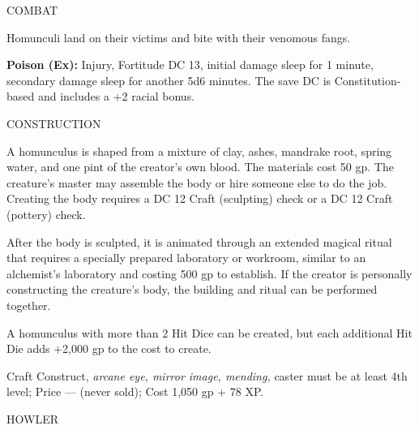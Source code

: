 \documentclass{article}
\begin{document}
COMBAT

Homunculi land on their victims and bite with their venomous fangs.

\textbf{Poison (Ex):} Injury, Fortitude DC 13, initial damage sleep for 1 minute, 
secondary damage sleep for another 5d6 minutes. The save DC is Constitution-based 
and includes a +2 racial bonus.

CONSTRUCTION

A homunculus is shaped from a mixture of clay, ashes, mandrake root, spring water, 
and one pint of the creator's own blood. The materials cost 50 gp. The creature's 
master may assemble the body or hire someone else to do the job. Creating the body 
requires a DC 12 Craft (sculpting) check or a DC 12 Craft (pottery) check.

After the body is sculpted, it is animated through an extended magical ritual that 
requires a specially prepared laboratory or workroom, similar to an alchemist's 
laboratory and costing 500 gp to establish. If the creator is personally constructing 
the creature's body, the building and ritual can be performed together.

A homunculus with more than 2 Hit Dice can be created, but each additional Hit 
Die adds +2,000 gp to the cost to create. 

Craft Construct, \textit{arcane eye, mirror image, mending, }caster must be at 
least 4th level; Price --- (never sold); Cost 1,050 gp + 78 XP.

\vspace{12pt}
{\LARGE{}HOWLER}
\end{document}
